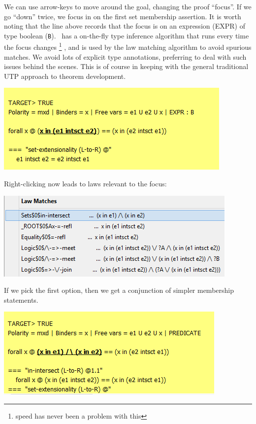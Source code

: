 \documentclass[copyright]{eptcs}
\begin{document}
\noindent
We can use arrow-keys to move around the goal, changing the proof ``focus''.
If we go ``down'' twice, we focus in on the first set membership assertion.
It is worth noting that the line above records that the focus is on an expression (EXPR)
of type boolean (\texttt{B}). \ has a on-the-fly type inference algorithm that runs
every time the focus changes%
\footnote{speed has never been a problem with this}%
, and is used by the law matching algorithm to avoid spurious matches.
We avoid lots of explicit type annotations, preferring to deal with such issues
behind the scenes. This is of course in keeping with the general traditional UTP approach
to theorem development.

\includegraphics[scale=0.5]{11-moving-down-again.png}

\noindent
Right-clicking now leads to laws relevant to the focus:

\includegraphics[scale=0.5]{12-laws-applicable-to-focus.png}

\noindent
If we pick the first option, then we get a conjunction of simpler membership statements.

\includegraphics[scale=0.5]{13-intersect-axiom-applied.png}
\end{document}
